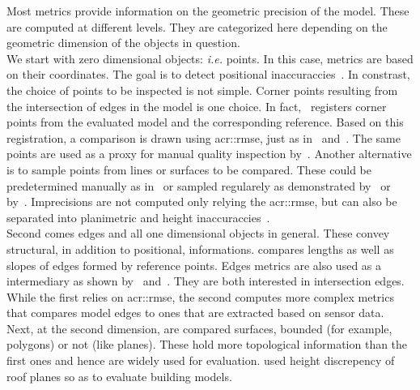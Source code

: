             Most metrics provide information on the geometric precision of the model.
            These are computed at different levels.
            They are categorized here depending on the geometric dimension of the objects in question.\\
            We start with zero dimensional objects: \textit{i.e.} points.
            In this case, metrics are based on their coordinates.
            The goal is to detect positional inaccuraccies~\parencite{kaartinen2005accuracy}.
            In constrast, the choice of points to be inspected is not simple.
            Corner points resulting from the intersection of edges in the model is one choice.
            In fact,~\textcite{zeng2014multicriteria} registers corner points from the evaluated model and the corresponding reference.
            Based on this registration, a comparison is drawn using \gls{acr::rmse}, just as in~\parencite{landes2012quality} and~\parencite{you2011quality}.
            The same points are used as a proxy for manual quality inspection by~\textcite{elberink2011quality}.
            Another alternative is to sample points from lines or surfaces to be compared.
            These could be predetermined manually as in~\textcite{kaartinen2005accuracy} or sampled regularely as demonstrated by~\textcite{vogtle2003quality} or by~\textcite{tran2019geometric}.
            Imprecisions are not computed only relying the \gls{acr::rmse}, but can also be separated into planimetric and height inaccuraccies~\parencite{vogtle2003quality, kaartinen2005accuracy, jaynes2003recognition}.\\
            Second comes edges and all one dimensional objects in general.
            These convey structural, in addition to positional, informations.
            \textcite{kaartinen2005accuracy} compares lengths as well as slopes of edges formed by reference points.
            Edges metrics are also used as a intermediary as shown by~\textcite{elberink2011quality} and~\textcite{michelin2013quality}.
            They are both interested in intersection edges.
            While the first relies on \gls{acr::rmse}, the second computes more complex metrics that compares model edges to ones that are extracted based on sensor data.\\
            Next, at the second dimension, are compared surfaces, bounded (for example, polygons) or not (like planes).
            These hold more topological information than the first ones and hence are widely used for evaluation.
            \textcite{rottensteiner2014results} used height discrepency of roof planes so as to evaluate building models.

